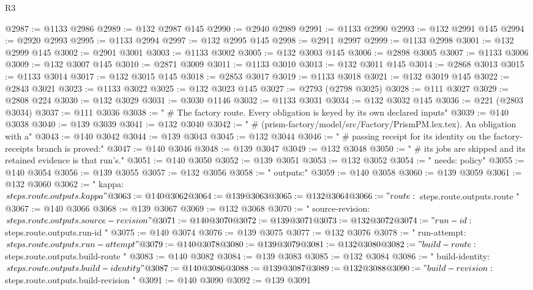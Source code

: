 \begin{lexlean}{R3}
\begin{coremodule}
@2987 := @1133 @2986
@2989 := @132 @2987 @145
@2990 := @2940 @2989
@2991 := @1133 @2990
@2993 := @132 @2991 @145
@2994 := @2920 @2993
@2995 := @1133 @2994
@2997 := @132 @2995 @145
@2998 := @2911 @2997
@2999 := @1133 @2998
@3001 := @132 @2999 @145
@3002 := @2901 @3001
@3003 := @1133 @3002
@3005 := @132 @3003 @145
@3006 := @2898 @3005
@3007 := @1133 @3006
@3009 := @132 @3007 @145
@3010 := @2871 @3009
@3011 := @1133 @3010
@3013 := @132 @3011 @145
@3014 := @2868 @3013
@3015 := @1133 @3014
@3017 := @132 @3015 @145
@3018 := @2853 @3017
@3019 := @1133 @3018
@3021 := @132 @3019 @145
@3022 := @2843 @3021
@3023 := @1133 @3022
@3025 := @132 @3023 @145
@3027 := @2793 (@2798 @3025)
@3028 := @111 @3027
@3029 := @2808 @224
@3030 := @132 @3029
@3031 := @3030 @1146
@3032 := @1133 @3031
@3034 := @132 @3032 @145
@3036 := @221 (@2803 @3034)
@3037 := @111 @3036
@3038 := "  # The factory route. Every obligation is keyed by its own declared inputs"
@3039 := @140 @3038
@3040 := @139 @3039
@3041 := @132 @3040
@3042 := "  # (prism-factory/model/src/Factory/PrismPM.lex.tex). An obligation with a"
@3043 := @140 @3042
@3044 := @139 @3043
@3045 := @132 @3044
@3046 := "  # passing receipt for its identity on the factory-receipts branch is proved:"
@3047 := @140 @3046
@3048 := @139 @3047
@3049 := @132 @3048
@3050 := "  # its jobs are skipped and its retained evidence is that run's."
@3051 := @140 @3050
@3052 := @139 @3051
@3053 := @132 @3052
@3054 := "    needs: policy"
@3055 := @140 @3054
@3056 := @139 @3055
@3057 := @132 @3056
@3058 := "    outputs:"
@3059 := @140 @3058
@3060 := @139 @3059
@3061 := @132 @3060
@3062 := "      kappa: ${{ steps.route.outputs.kappa }}"
@3063 := @140 @3062
@3064 := @139 @3063
@3065 := @132 @3064
@3066 := "      route: ${{ steps.route.outputs.route }}"
@3067 := @140 @3066
@3068 := @139 @3067
@3069 := @132 @3068
@3070 := "      source-revision: ${{ steps.route.outputs.source-revision }}"
@3071 := @140 @3070
@3072 := @139 @3071
@3073 := @132 @3072
@3074 := "      run-id: ${{ steps.route.outputs.run-id }}"
@3075 := @140 @3074
@3076 := @139 @3075
@3077 := @132 @3076
@3078 := "      run-attempt: ${{ steps.route.outputs.run-attempt }}"
@3079 := @140 @3078
@3080 := @139 @3079
@3081 := @132 @3080
@3082 := "      build-route: ${{ steps.route.outputs.build-route }}"
@3083 := @140 @3082
@3084 := @139 @3083
@3085 := @132 @3084
@3086 := "      build-identity: ${{ steps.route.outputs.build-identity }}"
@3087 := @140 @3086
@3088 := @139 @3087
@3089 := @132 @3088
@3090 := "      build-revision: ${{ steps.route.outputs.build-revision }}"
@3091 := @140 @3090
@3092 := @139 @3091

\end{coremodule}
\end{lexlean}
